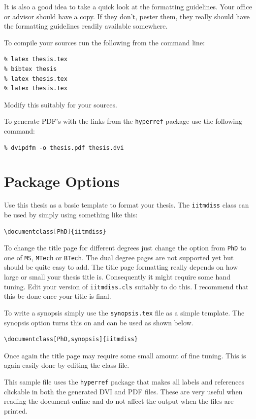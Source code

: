 \documentclass[MTech]{iitmdiss}
\begin{document}
It is also a good idea to take a quick look at the formatting
guidelines.  Your office or advisor should have a copy.  If they
don't, pester them, they really should have the formatting guidelines
readily available somewhere.

To compile your sources run the following from the command line:
\begin{verbatim}
% latex thesis.tex
% bibtex thesis
% latex thesis.tex
% latex thesis.tex
\end{verbatim}
Modify this suitably for your sources.

To generate PDF's with the links from the \verb+hyperref+ package use
the following command:
\begin{verbatim}
% dvipdfm -o thesis.pdf thesis.dvi
\end{verbatim}

\section{Package Options}

Use this thesis as a basic template to format your thesis.  The
\verb+iitmdiss+ class can be used by simply using something like this:
\begin{verbatim}
\documentclass[PhD]{iitmdiss}  
\end{verbatim}

To change the title page for different degrees just change the option
from \verb+PhD+ to one of \verb+MS+, \verb+MTech+ or \verb+BTech+.
The dual degree pages are not supported yet but should be quite easy
to add.  The title page formatting really depends on how large or
small your thesis title is.  Consequently it might require some hand
tuning.  Edit your version of \verb+iitmdiss.cls+ suitably to do this.
I recommend that this be done once your title is final.

To write a synopsis simply use the \verb+synopsis.tex+ file as a
simple template.  The synopsis option turns this on and can be used as
shown below.
\begin{verbatim}
\documentclass[PhD,synopsis]{iitmdiss}                                
\end{verbatim}

Once again the title page may require some small amount of fine
tuning.  This is again easily done by editing the class file.

This sample file uses the \verb+hyperref+ package that makes all
labels and references clickable in both the generated DVI and PDF
files.  These are very useful when reading the document online and do
not affect the output when the files are printed.
\end{document}
